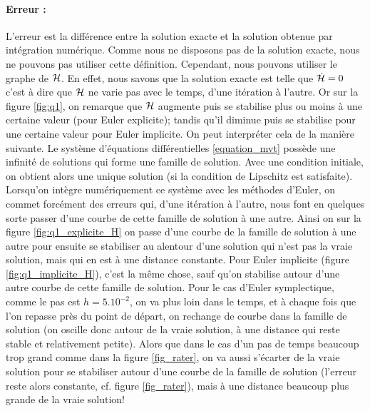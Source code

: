 \paragraph{Erreur : }
L'erreur est la différence entre la solution exacte et la solution obtenue par intégration numérique. Comme nous ne disposons pas de la solution exacte, nous ne pouvons pas utiliser cette définition. Cependant, nous pouvons utiliser le graphe de $\mathcal{H}$. 
En effet, nous savons que la solution exacte est telle que $\dot{\mathcal{H}} = 0$ c'est à dire que $\mathcal{H}$ ne varie pas avec le temps, d'une itération à l'autre. Or sur la figure \ref{fig:q1}, on remarque que $\mathcal{H}$ augmente puis se stabilise plus ou moins à une certaine valeur (pour Euler explicite); tandis qu'il diminue puis se stabilise pour une certaine valeur pour Euler implicite. 
On peut interpréter cela de la manière suivante. Le système d'équations différentielles \ref{equation_mvt} possède une infinité de solutions qui forme une famille de solution. Avec une condition initiale, on obtient alors une unique solution (si la condition de Lipschitz est satisfaite). 
Lorsqu'on intègre numériquement ce système avec les méthodes d'Euler, on commet forcément des erreurs qui, d'une itération à l'autre, nous font en quelques sorte passer d'une courbe de cette famille de solution à une autre. 
Ainsi on sur la figure \ref{fig:q1_explicite_H} on passe d'une courbe de la famille de solution à une autre pour ensuite se stabiliser au alentour d'une solution qui n'est pas la vraie solution, mais qui en est à une distance constante. Pour Euler implicite (figure \ref{fig:q1_implicite_H}), c'est la même chose, sauf qu'on stabilise autour d'une autre courbe de cette famille de solution. 
Pour le cas d'Euler symplectique, comme le pas est $h=5.10^{-2}$, on va plus loin dans le temps, et à chaque fois que l'on repasse près du point de départ, on rechange de courbe dans la famille de solution (on oscille donc autour de la vraie solution, à une distance qui reste stable et relativement petite). Alors que dans le cas d'un pas de temps beaucoup trop grand comme dans la figure \ref{fig_rater}, on va aussi s'écarter de la vraie solution pour se stabiliser autour d'une courbe de la famille de solution (l'erreur reste alors constante, cf. figure \ref{fig_rater}), mais à une distance beaucoup plus grande de la vraie solution!















